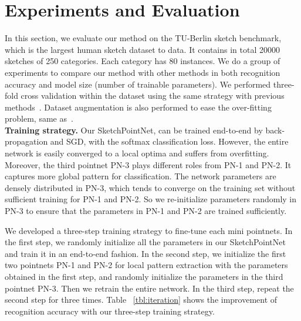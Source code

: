 \section{Experiments and Evaluation}
\label{sec:experiments}

In this section, we evaluate our method on the TU-Berlin sketch benchmark, which is the largest human sketch dataset to data. 
%
It contains in total 20000 sketches of 250 categories. Each category has 80 instances. 
%
We do a group of experiments to compare our method with other methods in both recognition accuracy and model size (number of trainable parameters). 
%
We performed three-fold cross validation within the dataset using 
the same strategy with previous methods~\cite{Yu2015SketchaNetTB, Dupont2016DeepSketch2D}.
Dataset augmentation is also performed to ease the over-fitting problem, same as~\cite{Yu2015SketchaNetTB}.
\\


\noindent \textbf{Training strategy.} 
%
Our SketchPointNet,  can be trained end-to-end by back-propagation and SGD, with the softmax classification loss.
%
However, the entire network is easily converged to a local optima and suffers from overfitting. 
Moreover, the third pointnet PN-3 plays different roles from PN-1 and PN-2. It captures more global pattern for classification. 
%
%
The network parameters are densely distributed in PN-3, which tends to converge on the training set without sufficient training for PN-1 and PN-2. 
So we re-initialize parameters randomly in PN-3 to ensure that the parameters in PN-1 and PN-2 are trained sufficiently. 

We developed a three-step training strategy to fine-tune each mini pointnets.
%
In the first step, we randomly initialize all the parameters in our SketchPointNet and  train it in an end-to-end fashion.
%
In the second step, we initialize the first two pointnets PN-1 and PN-2 for local pattern extraction with the parameters obtained in the first step, and randomly initialize the parameters in the third pointnet PN-3. Then we retrain the entire network.
%
In the third step, repeat the second step for three times.
%
Table ~\ref{tbl:iteration} shows the improvement of recognition accuracy with our three-step training strategy.

